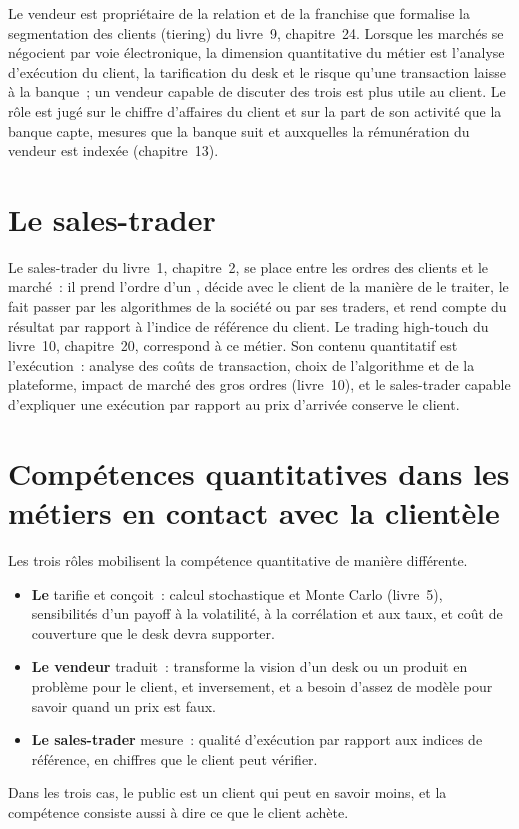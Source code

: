 Le vendeur est propriétaire de la relation et de la franchise que formalise la segmentation des clients (tiering) du livre~9, chapitre~24. Lorsque
les marchés se négocient par voie électronique, la dimension quantitative du métier est l'analyse d'exécution du client, la tarification du desk et
le risque qu'une transaction laisse à la banque~; un vendeur capable de discuter des trois est plus utile au client. Le rôle est
jugé sur le chiffre d'affaires du client et sur la part de son activité que la banque capte, mesures que la banque suit et auxquelles la rémunération du vendeur est indexée
(chapitre~13).

\section{Le sales-trader}

Le sales-trader du livre~1, chapitre~2, se place entre les ordres des clients et le marché~: il prend l'ordre d'un ,
décide avec le client de la manière de le traiter, le fait passer par les algorithmes de la société ou par ses traders, et rend compte du résultat
par rapport à l'indice de référence du client. Le trading high-touch du livre~10, chapitre~20, correspond à ce métier. Son contenu quantitatif est
l'exécution~: analyse des coûts de transaction, choix de l'algorithme et de la plateforme, impact de marché des gros ordres (livre~10), et
le sales-trader capable d'expliquer une exécution par rapport au prix d'arrivée conserve le client.

\section{Compétences quantitatives dans les métiers en contact avec la clientèle}

Les trois rôles mobilisent la compétence quantitative de manière différente.
\begin{itemize}
\item \textbf{Le } tarifie et conçoit~: calcul stochastique et Monte Carlo (livre~5), sensibilités d'un
payoff à la volatilité, à la corrélation et aux taux, et coût de couverture que le desk devra supporter.
\item \textbf{Le vendeur} traduit~: transforme la vision d'un desk ou un produit en problème pour le client, et inversement, et a besoin
d'assez de modèle pour savoir quand un prix est faux.
\item \textbf{Le sales-trader} mesure~: qualité d'exécution par rapport aux indices de référence, en chiffres que le client peut vérifier.
\end{itemize}
Dans les trois cas, le public est un client qui peut en savoir moins, et la compétence consiste aussi à dire ce que le client achète.

